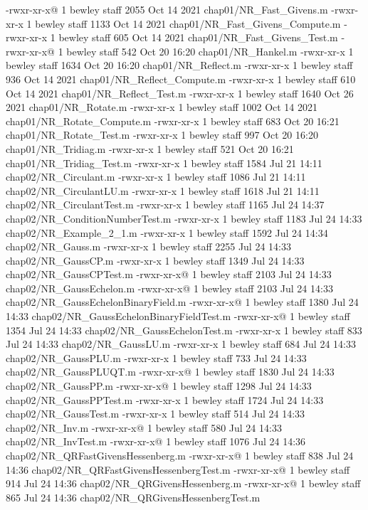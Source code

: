 -rwxr-xr-x@ 1 bewley  staff   2055 Oct 14  2021 chap01/NR_Fast_Givens.m
-rwxr-xr-x  1 bewley  staff   1133 Oct 14  2021 chap01/NR_Fast_Givens_Compute.m
-rwxr-xr-x  1 bewley  staff    605 Oct 14  2021 chap01/NR_Fast_Givens_Test.m
-rwxr-xr-x@ 1 bewley  staff    542 Oct 20 16:20 chap01/NR_Hankel.m
-rwxr-xr-x  1 bewley  staff   1634 Oct 20 16:20 chap01/NR_Reflect.m
-rwxr-xr-x  1 bewley  staff    936 Oct 14  2021 chap01/NR_Reflect_Compute.m
-rwxr-xr-x  1 bewley  staff    610 Oct 14  2021 chap01/NR_Reflect_Test.m
-rwxr-xr-x  1 bewley  staff   1640 Oct 26  2021 chap01/NR_Rotate.m
-rwxr-xr-x  1 bewley  staff   1002 Oct 14  2021 chap01/NR_Rotate_Compute.m
-rwxr-xr-x  1 bewley  staff    683 Oct 20 16:21 chap01/NR_Rotate_Test.m
-rwxr-xr-x  1 bewley  staff    997 Oct 20 16:20 chap01/NR_Tridiag.m
-rwxr-xr-x  1 bewley  staff    521 Oct 20 16:21 chap01/NR_Tridiag_Test.m
-rwxr-xr-x  1 bewley  staff   1584 Jul 21 14:11 chap02/NR_Circulant.m
-rwxr-xr-x  1 bewley  staff   1086 Jul 21 14:11 chap02/NR_CirculantLU.m
-rwxr-xr-x  1 bewley  staff   1618 Jul 21 14:11 chap02/NR_CirculantTest.m
-rwxr-xr-x  1 bewley  staff   1165 Jul 24 14:37 chap02/NR_ConditionNumberTest.m
-rwxr-xr-x  1 bewley  staff   1183 Jul 24 14:33 chap02/NR_Example_2_1.m
-rwxr-xr-x  1 bewley  staff   1592 Jul 24 14:34 chap02/NR_Gauss.m
-rwxr-xr-x  1 bewley  staff   2255 Jul 24 14:33 chap02/NR_GaussCP.m
-rwxr-xr-x  1 bewley  staff   1349 Jul 24 14:33 chap02/NR_GaussCPTest.m
-rwxr-xr-x@ 1 bewley  staff   2103 Jul 24 14:33 chap02/NR_GaussEchelon.m
-rwxr-xr-x@ 1 bewley  staff   2103 Jul 24 14:33 chap02/NR_GaussEchelonBinaryField.m
-rwxr-xr-x@ 1 bewley  staff   1380 Jul 24 14:33 chap02/NR_GaussEchelonBinaryFieldTest.m
-rwxr-xr-x@ 1 bewley  staff   1354 Jul 24 14:33 chap02/NR_GaussEchelonTest.m
-rwxr-xr-x  1 bewley  staff    833 Jul 24 14:33 chap02/NR_GaussLU.m
-rwxr-xr-x  1 bewley  staff    684 Jul 24 14:33 chap02/NR_GaussPLU.m
-rwxr-xr-x  1 bewley  staff    733 Jul 24 14:33 chap02/NR_GaussPLUQT.m
-rwxr-xr-x@ 1 bewley  staff   1830 Jul 24 14:33 chap02/NR_GaussPP.m
-rwxr-xr-x@ 1 bewley  staff   1298 Jul 24 14:33 chap02/NR_GaussPPTest.m
-rwxr-xr-x  1 bewley  staff   1724 Jul 24 14:33 chap02/NR_GaussTest.m
-rwxr-xr-x  1 bewley  staff    514 Jul 24 14:33 chap02/NR_Inv.m
-rwxr-xr-x@ 1 bewley  staff    580 Jul 24 14:33 chap02/NR_InvTest.m
-rwxr-xr-x@ 1 bewley  staff   1076 Jul 24 14:36 chap02/NR_QRFastGivensHessenberg.m
-rwxr-xr-x@ 1 bewley  staff    838 Jul 24 14:36 chap02/NR_QRFastGivensHessenbergTest.m
-rwxr-xr-x@ 1 bewley  staff    914 Jul 24 14:36 chap02/NR_QRGivensHessenberg.m
-rwxr-xr-x@ 1 bewley  staff    865 Jul 24 14:36 chap02/NR_QRGivensHessenbergTest.m
